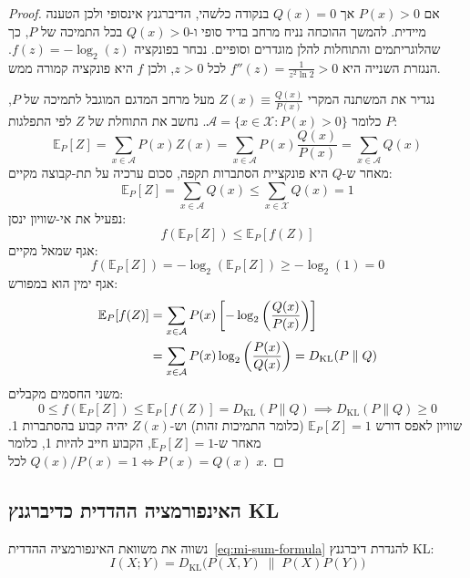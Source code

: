 \begin{proof}
אם $P(x)>0$ אך $Q(x)=0$ בנקודה כלשהי, הדיברגנץ אינסופי ולכן הטענה מיידית. להמשך ההוכחה נניח מרחב בדיד סופי ו-$Q(x)>0$ בכל התמיכה של $P$, כך שהלוגריתמים והתוחלות להלן מוגדרים וסופיים.
נבחר בפונקציה $f(z) = -\log_2(z)$. 
הנגזרת השנייה היא $f''(z) = \frac{1}{z^2 \ln 2} > 0$ לכל $z > 0$, ולכן $f$ היא פונקציה קמורה ממש.

נגדיר את המשתנה המקרי $Z(x) \equiv \frac{Q(x)}{P(x)}$ מעל מרחב המדגם המוגבל לתמיכה של $P$, כלומר $\mathcal{A} = \{x \in \mathcal{X} : P(x) > 0\}$.
נחשב את התוחלת של $Z$ לפי התפלגות $P$:
\begin{equation}
\mathbb{E}_P[Z] = \sum_{x \in \mathcal{A}} P(x) Z(x) = \sum_{x \in \mathcal{A}} P(x) \frac{Q(x)}{P(x)} = \sum_{x \in \mathcal{A}} Q(x)
\end{equation}
מאחר ש-$Q$ היא פונקציית הסתברות תקפה, סכום ערכיה על תת-קבוצה מקיים:
\begin{equation}
\mathbb{E}_P[Z] = \sum_{x \in \mathcal{A}} Q(x) \le \sum_{x \in \mathcal{X}} Q(x) = 1
\end{equation}
נפעיל את אי-שוויון ינסן:
\begin{equation}
f(\mathbb{E}_P[Z]) \le \mathbb{E}_P[f(Z)]
\end{equation}
אגף שמאל מקיים:
\begin{equation}
f(\mathbb{E}_P[Z]) = -\log_2(\mathbb{E}_P[Z]) \ge -\log_2(1) = 0
\end{equation}
אגף ימין הוא במפורש:
\begin{align}
\mathbb{E}_P[f(Z)] &= \sum_{x \in \mathcal{A}} P(x) \left[ -\log_2\left(\frac{Q(x)}{P(x)}\right) \right] \notag\\
&= \sum_{x \in \mathcal{A}} P(x) \log_2\left(\frac{P(x)}{Q(x)}\right) = D_{\mathrm{KL}}(P \parallel Q)
\end{align}
משני החסמים מקבלים:
\begin{equation}
0 \le f(\mathbb{E}_P[Z]) \le \mathbb{E}_P[f(Z)] = D_{\mathrm{KL}}(P \parallel Q) \implies \boxed{D_{\mathrm{KL}}(P \parallel Q) \ge 0}
\end{equation}
שוויון לאפס דורש $\mathbb{E}_P[Z] = 1$ (כלומר התמיכות זהות) וש-$Z(x)$ יהיה קבוע בהסתברות 1. מאחר ש-$\mathbb{E}_P[Z] = 1$, הקבוע חייב להיות 1, כלומר $Q(x)/P(x) = 1 \iff P(x) = Q(x)$ לכל $x$.
\end{proof}

\subsection{האינפורמציה ההדדית כדיברגנץ KL}
נשווה את משוואת האינפורמציה ההדדית~\eqref{eq:mi-sum-formula} להגדרת דיברגנץ KL:
\begin{equation}\label{eq:mi-as-kl}
\boxed{I(X; Y) = D_{\mathrm{KL}}\Big( P(X, Y) \;\parallel\; P(X)P(Y) \Big)}
\end{equation}


